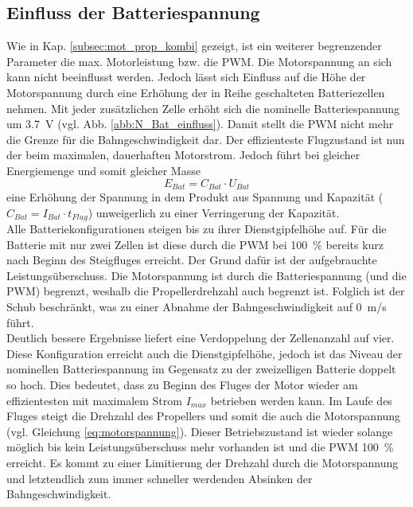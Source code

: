 \subsection{Einfluss der Batteriespannung}
\label{subsec:einfluss_n_bat}
Wie in Kap. \ref{subsec:mot_prop_kombi} gezeigt, ist ein weiterer begrenzender Parameter die max. Motorleistung bzw. die PWM. Die Motorspannung an sich kann nicht beeinflusst werden. Jedoch lässt sich Einfluss auf die Höhe der Motorspannung durch eine Erhöhung der in Reihe geschalteten Batteriezellen nehmen. Mit jeder zusätzlichen Zelle erhöht sich die nominelle Batteriespannung um \SI{3,7}{V} (vgl. Abb. \ref{abb:N_Bat_einfluss}). Damit stellt die PWM nicht mehr die Grenze für die Bahngeschwindigkeit dar. Der effizienteste Flugzustand ist nun der beim maximalen, dauerhaften Motorstrom. Jedoch führt bei gleicher Energiemenge und somit gleicher Masse 
\begin{equation}
	E_{Bat} = C_{Bat}\cdot U_{Bat}
\end{equation}
eine Erhöhung der Spannung in dem Produkt aus Spannung und Kapazität (\ensuremath{C_{Bat} = I_{Bat}\cdot t_{Flug}}) unweigerlich zu einer Verringerung der Kapazität.  \\
Alle Batteriekonfigurationen steigen bis zu ihrer Dienstgipfelhöhe auf. 
Für die Batterie mit nur zwei Zellen ist diese durch die PWM bei \SI{100}{\%} bereits kurz nach Beginn des Steigfluges erreicht. Der Grund dafür ist der aufgebrauchte Leistungsüberschuss. Die Motorspannung ist durch die Batteriespannung (und die PWM) begrenzt, weshalb die Propellerdrehzahl auch begrenzt ist. Folglich ist der Schub beschränkt, was zu einer Abnahme der Bahngeschwindigkeit auf \SI{0}{m/s} führt. \\
Deutlich bessere Ergebnisse liefert eine Verdoppelung der Zellenanzahl auf vier. Diese Konfiguration erreicht auch die Dienstgipfelhöhe, jedoch ist das Niveau der nominellen Batteriespannung im Gegensatz zu der zweizelligen Batterie doppelt so hoch. Dies bedeutet, dass zu Beginn des Fluges der Motor wieder am effizientesten mit maximalem Strom \ensuremath{I_{max}} betrieben werden kann. Im Laufe des Fluges steigt die Drehzahl des Propellers und somit die auch die Motorspannung (vgl. Gleichung \eqref{eq:motorspannung}). Dieser Betriebszustand ist wieder solange möglich bis kein Leistungsüberschuss mehr vorhanden ist und die PWM \SI{100}{\%} erreicht. Es kommt zu einer Limitierung der Drehzahl durch die Motorspannung und letztendlich zum immer schneller werdenden Absinken der Bahngeschwindigkeit. \\
